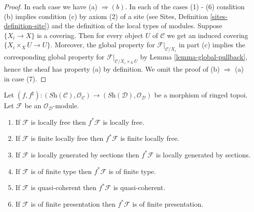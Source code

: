 \begin{proof}
In each case we have (a) $\Rightarrow (b)$. In each of the cases (1) - (6)
condition (b) implies condition (c) by axiom (2) of a site
(see Sites, Definition \ref{sites-definition-site})
and the definition of the local types of modules.
Suppose $\{X_i \to X\}$ is a covering.
Then for every object $U$ of $\mathcal{C}$ we get an
induced covering $\{X_i \times_X U \to U\}$. Moreover, the global
property for $\mathcal{F}|_{\mathcal{C}/X_i}$ in part (c) implies
the corresponding global property for
$\mathcal{F}|_{\mathcal{C}/X_i \times_X U}$ by
Lemma \ref{lemma-global-pullback}, hence the sheaf has property (a)
by definition. We omit the proof of (b) $\Rightarrow$ (a) in case (7).
\end{proof}

\begin{lemma}
\label{lemma-local-pullback}
Let
$(f, f^\sharp) :
(\textit{Sh}(\mathcal{C}), \mathcal{O}_{\mathcal{C}})
\to
(\textit{Sh}(\mathcal{D}), \mathcal{O}_{\mathcal{D}})$
be a morphism of ringed topoi.
Let $\mathcal{F}$ be an $\mathcal{O}_{\mathcal{D}}$-module.
\begin{enumerate}
\item If $\mathcal{F}$ is locally free then $f^*\mathcal{F}$ is locally free.
\item If $\mathcal{F}$ is finite locally free then $f^*\mathcal{F}$ is
finite locally free.
\item If $\mathcal{F}$ is locally generated by sections
then $f^*\mathcal{F}$ is locally generated by sections.
\item If $\mathcal{F}$ is of finite type
then $f^*\mathcal{F}$ is of finite type.
\item If $\mathcal{F}$ is quasi-coherent then
$f^*\mathcal{F}$ is quasi-coherent.
\item If $\mathcal{F}$ is of finite presentation
then $f^*\mathcal{F}$ is of finite presentation.
\end{enumerate}
\end{lemma}

